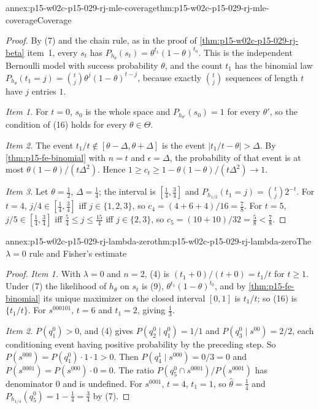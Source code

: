 \begin{annexitem}{annex:p15-w02c-p15-029-rj-mle-coverage}{thm:p15-w02c-p15-029-rj-mle-coverage}{Coverage}
\begin{proof}
By (7) and the chain rule, as in the proof of
\cref{thm:p15-w02c-p15-029-rj-beta} item~1, every \(s_t\) has
\(P_{h_\theta}(s_t)=\theta^{t_1}(1-\theta)^{t_0}\). This is the
independent Bernoulli model with success probability \(\theta\), and
the count \(t_1\) has the binomial law
\(P_{h_\theta}(t_1=j)=\binom tj\theta^j(1-\theta)^{t-j}\), because exactly
\(\binom tj\) sequences of length \(t\) have \(j\) entries \(1\).

\emph{Item 1.} For \(t=0\), \(s_0\) is the whole space and
\(P_{h_{\theta'}}(s_0)=1\) for every \(\theta'\), so the condition of
(16) holds for every \(\theta\in\Theta\).

\emph{Item 2.} The event \(t_1/t\notin[\theta-\Delta,\theta+\Delta]\)
is the event \(|t_1/t-\theta|>\Delta\). By \cref{thm:p15-fe-binomial} with
\(n=t\) and \(\epsilon=\Delta\), the probability of that event is at most
\(\theta(1-\theta)/(t\Delta^2)\). Hence
\(1\ge c_t\ge1-\theta(1-\theta)/(t\Delta^2)\to1\).

\emph{Item 3.} Let \(\theta=\tfrac12\), \(\Delta=\tfrac14\); the interval
is \([\tfrac14,\tfrac34]\) and \(P_{h_{1/2}}(t_1=j)=\binom tj2^{-t}\). For
\(t=4\), \(j/4\in[\tfrac14,\tfrac34]\) iff \(j\in\{1,2,3\}\), so
\(c_4=(4+6+4)/16=\tfrac78\). For \(t=5\), \(j/5\in[\tfrac14,\tfrac34]\)
iff \(\tfrac54\le j\le\tfrac{15}4\) iff \(j\in\{2,3\}\), so
\(c_5=(10+10)/32=\tfrac58<\tfrac78\).
\end{proof}
\end{annexitem}

\begin{annexitem}{annex:p15-w02c-p15-029-rj-lambda-zero}{thm:p15-w02c-p15-029-rj-lambda-zero}{The \texorpdfstring{\(\lambda=0\)}{lambda = 0} rule and Fisher's estimate}
\begin{proof}
\emph{Item 1.} With \(\lambda=0\) and \(n=2\), (4) is
\((t_1+0)/(t+0)=t_1/t\) for \(t\ge1\). Under (7) the likelihood of
\(h_\theta\) on \(s_t\) is (9), \(\theta^{t_1}(1-\theta)^{t_0}\), and by
\cref{thm:p15-fe-binomial} its unique maximizer on the closed interval
\([0,1]\) is \(t_1/t\); so (16) is \(\{t_1/t\}\). For \(s^{000101}\),
\(t=6\) and \(t_1=2\), giving \(\tfrac13\).

\emph{Item 2.} \(P(q^0_1)>0\), and (4) gives
\(P(q^0_2\mid q^0_1)=1/1\) and \(P(q^0_3\mid s^{00})=2/2\), each
conditioning event having positive probability by the preceding step.
So \(P(s^{000})=P(q^0_1)\cdot1\cdot1>0\). Then
\(P(q^1_4\mid s^{000})=0/3=0\) and
\(P(s^{0001})=P(s^{000})\cdot0=0\). The ratio
\(P(q^0_5\cap s^{0001})/P(s^{0001})\) has denominator \(0\) and is
undefined. For \(s^{0001}\), \(t=4\), \(t_1=1\), so
\(\hat\theta=\tfrac14\) and
\(P_{h_{1/4}}(q^0_5)=1-\tfrac14=\tfrac34\) by (7).
\end{proof}
\end{annexitem}

